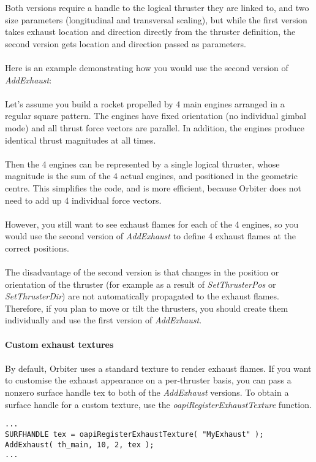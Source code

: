 \documentclass[Orbiter Developer Manual.tex]{subfiles}
\begin{document}
\noindent
Both versions require a handle to the logical thruster they are linked to, and two size parameters (longitudinal and transversal scaling), but while the first version takes exhaust location and direction directly from the thruster definition, the second version gets location and direction passed as parameters.\\
\\
Here is an example demonstrating how you would use the second version of \textit{AddExhaust}:\\
\\
Let's assume you build a rocket propelled by 4 main engines arranged in a regular square pattern. The engines have fixed orientation (no individual gimbal mode) and all thrust force vectors are parallel. In addition, the engines produce identical thrust magnitudes at all times.\\
\\
Then the 4 engines can be represented by a single logical thruster, whose magnitude is the sum of the 4 actual engines, and positioned in the geometric centre. This simplifies the code, and is more efficient, because Orbiter does not need to add up 4 individual force vectors.\\
\\
However, you still want to see exhaust flames for each of the 4 engines, so you would use the second version of \textit{AddExhaust} to define 4 exhaust flames at the correct positions.\\
\\
The disadvantage of the second version is that changes in the position or orientation of the thruster (for example as a result of \textit{SetThrusterPos} or \textit{SetThrusterDir}) are not automatically propagated to the exhaust flames. Therefore, if you plan to move or tilt the thrusters, you should create them individually and use the first version of \textit{AddExhaust}.\\
\\
\textbf{Custom exhaust textures}\\
\\
By default, Orbiter uses a standard texture to render exhaust flames. If you want to customise the exhaust appearance on a per-thruster basis, you can pass a nonzero surface handle tex to both of the \textit{AddExhaust} versions. To obtain a surface handle for a custom texture, use the \textit{oapiRegisterExhaustTexture} function.

\begin{lstlisting}
...
SURFHANDLE tex = oapiRegisterExhaustTexture( "MyExhaust" );
AddExhaust( th_main, 10, 2, tex );
...
\end{lstlisting}
\end{document}
